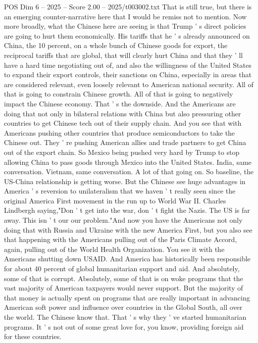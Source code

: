 \begin{textsample}{POS Dim 6 – 2025 – Score 2.00 – 2025/t003002.txt}
That is still true, but there is an emerging counter-narrative here that I would be remiss not to mention.
Now more broadly, what the Chinese here are seeing is that Trump ' s direct policies are going to hurt them economically.
His tariffs that he ' s already announced on China, the 10 percent, on a whole bunch of Chinese goods for export, the reciprocal tariffs that are global, that will clearly hurt China and that they ' ll have a hard time negotiating out of, and also the willingness of the United States to expand their export controls, their sanctions on China, especially in areas that are considered relevant, even loosely relevant to American national security.
All of that is going to constrain Chinese growth.
All of that is going to negatively impact the Chinese economy.
That ' s the downside.
And the Americans are doing that not only in bilateral relations with China but also pressuring other countries to get Chinese tech out of their supply chain.
And you see that with Americans pushing other countries that produce semiconductors to take the Chinese out.
They ' re pushing American allies and trade partners to get China out of the export chain.
So Mexico being pushed very hard by Trump to stop allowing China to pass goods through Mexico into the United States.
India, same conversation.
Vietnam, same conversation.
A lot of that going on.
So baseline, the US-China relationship is getting worse.
But the Chinese see huge advantages in America ' s reversion to unilateralism that we haven ' t really seen since the original America First movement in the run up to World War II.
Charles Lindbergh saying,"Don ' t get into the war, don ' t fight the Nazis.
The US is far away.
This isn ' t our our problem."And now you have the Americans not only doing that with Russia and Ukraine with the new America First, but you also see that happening with the Americans pulling out of the Paris Climate Accord, again, pulling out of the World Health Organization.
You see it with the Americans shutting down USAID.
And America has historically been responsible for about 40 percent of global humanitarian support and aid.
And absolutely, some of that is corrupt.
Absolutely, some of that is on woke programs that the vast majority of American taxpayers would never support.
But the majority of that money is actually spent on programs that are really important in advancing American soft power and influence over countries in the Global South, all over the world.
The Chinese know that.
That ' s why they ' ve started humanitarian programs.
It ' s not out of some great love for, you know, providing foreign aid for these countries.

\end{textsample}
